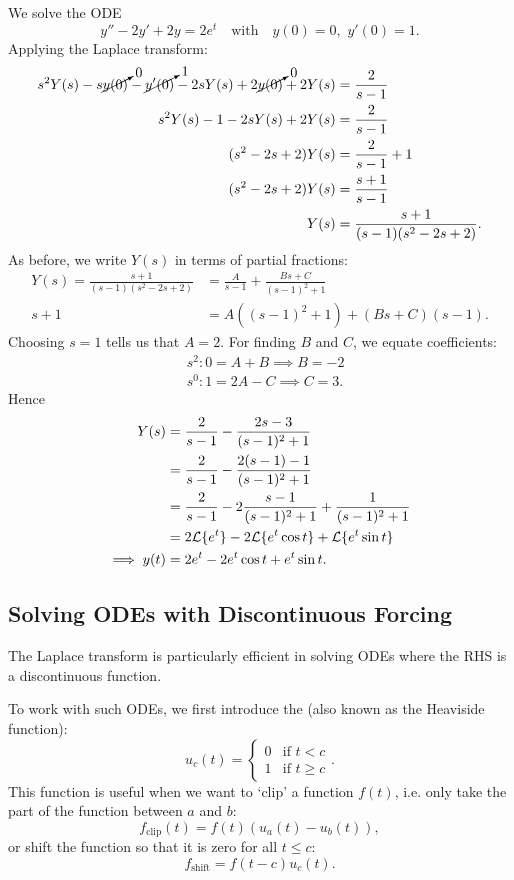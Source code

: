 \begin{eg}
	We solve the ODE
	\[
	y''-2y'+2y=2e^t \quad\text{with}\quad y(0)=0, \,\,y'(0)=1.
	\]
	Applying the Laplace transform:
	\begin{align*}
		s^2Y(s) - s\cancelto{0}{y(0)} - \cancelto{1}{y'(0)} - 2sY(s) + 2\cancelto{0}{y(0)} + 2Y(s) &= \frac{2}{s-1} \\
		s^2Y(s) - 1 - 2sY(s) + 2Y(s) &= \frac{2}{s-1} \\
		(s^2-2s+2)Y(s) &= \frac{2}{s-1} + 1 \\
		(s^2-2s+2)Y(s) &= \frac{s+1}{s-1} \\
		Y(s) &= \frac{s+1}{(s-1)(s^2-2s+2)}.
	\end{align*}
	As before, we write $Y(s)$ in terms of partial fractions:
	\begin{align*}
		Y(s) = \frac{s+1}{(s-1)(s^2-2s+2)} &= \frac{A}{s-1} + \frac{Bs+C}{(s-1)^2+1} \\
		s+1 &= A((s-1)^2+1) + (Bs+C)(s-1).
	\end{align*}
	Choosing $s=1$ tells us that $A=2$. For finding $B$ and $C$, we equate coefficients:
	\begin{align*}
		&s^2 : 0 = A+B \implies B=-2 \\
		&s^0 : 1 = 2A-C \implies C=3.
	\end{align*}
	Hence
	\begin{align*}
		Y(s) &= \frac{2}{s-1} - \frac{2s-3}{(s-1)^2+1} \\
		&= \frac{2}{s-1} - \frac{2(s-1)-1}{(s-1)^2+1} \\
		&= \frac{2}{s-1} - 2\frac{s-1}{(s-1)^2+1} + \frac{1}{(s-1)^2+1} \\
		&= 2\mathcal{L}\{e^t\} - 2\mathcal{L}\{e^t\cos{t}\} + \mathcal{L}\{e^t\sin{t}\} \\
		\implies y(t) &= 2e^t - 2e^t\cos{t} + e^t\sin{t}.
	\end{align*}
\end{eg}

\subsection{Solving ODEs with Discontinuous Forcing}

The Laplace transform is particularly efficient in solving ODEs where the RHS is a discontinuous function.

To work with such ODEs, we first introduce the  (also known as the Heaviside function):
\begin{equation}
	u_c(t) = \begin{cases}0 & \text{if } t<c \\ 1 & \text{if } t \geq c\end{cases}.
\end{equation}
This function is useful when we want to `clip' a function $f(t)$, i.e. only take the part of the function between $a$ and $b$:
\[
f_{\text{clip}}(t) = f(t)\left(u_a(t) - u_b(t)\right),
\]
or shift the function so that it is zero for all $t \leq c$:
\[
f_{\text{shift}} = f(t-c)u_c(t).
\]

